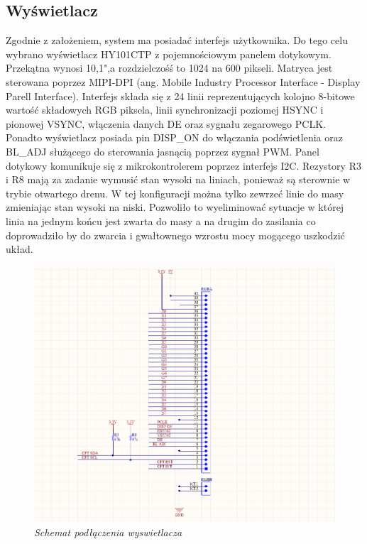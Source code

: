 \documentclass[eng,printmode]{mgr}
\begin{document}
\subsection*{Wyświetlacz}
Zgodnie z założeniem, system ma posiadać interfejs  użytkownika. Do tego celu wybrano wyświetlacz HY101CTP z pojemnościowym panelem dotykowym. Przekątna wynosi 10,1",a rozdzielczośś to 1024 na 600 pikseli. Matryca jest sterowana poprzez MIPI-DPI (ang. Mobile Industry Processor Interface - Display Parell Interface). Interfejs składa się z 24 linii reprezentujących kolojno 8-bitowe wartość składowych RGB piksela, linii synchronizacji poziomej HSYNC i pionowej VSYNC, włączenia danych DE oraz sygnału zegarowego PCLK. Ponadto wyświetlacz posiada pin DISP\_ON do włączania podświetlenia oraz BL\_ADJ służącego do sterowania jasnącią poprzez sygnał PWM. Panel dotykowy komunikuje się z mikrokontrolerem poprzez interfejs I2C. Rezystory R3 i R8 mają za zadanie wymusić stan wysoki na liniach, ponieważ są sterownie w trybie otwartego drenu. W tej konfiguracji można tylko zewrzeć linie do masy zmieniając stan wysoki na niski. Pozwoliło to wyeliminować sytuacje w której linia na jednym końcu jest zwarta do masy a na drugim do zasilania co doprowadziło by do zwarcia i gwałtownego wzrostu mocy mogącego uszkodzić układ.
\begin{figure}[!h]
    \centering
    \includegraphics[width=\textwidth]{schematics/display.png}
    \caption{\textit{\scriptsize Schemat podłączenia wyswietlacza}}
\end{figure}
\end{document}

